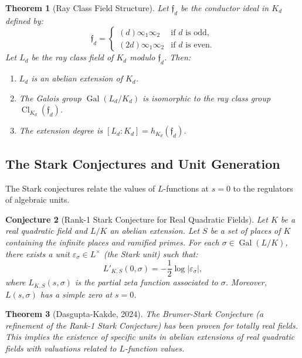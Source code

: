 \documentclass[a4paper,11pt]{article}
\newtheorem{theorem}{Theorem}[section]
\newtheorem{conjecture}[theorem]{Conjecture}
\DeclareMathOperator{\Gal}{Gal}
\DeclareMathOperator{\Cl}{Cl}
\begin{document}
\begin{theorem}[Ray Class Field Structure]\label{thm:ray-class}
Let $\mathfrak{f}_d$ be the conductor ideal in $K_d$ defined by:
\begin{equation}
\mathfrak{f}_d = \begin{cases}
(d)\infty_1\infty_2 & \text{if } d \text{ is odd}, \\
(2d)\infty_1\infty_2 & \text{if } d \text{ is even}.
\end{cases}
\end{equation}
Let $L_d$ be the ray class field of $K_d$ modulo $\mathfrak{f}_d$. Then:
\begin{enumerate}[label=(\roman*)]
    \item $L_d$ is an abelian extension of $K_d$.
    \item The Galois group $\Gal(L_d/K_d)$ is isomorphic to the ray class group $\Cl_{K_d}(\mathfrak{f}_d)$.
    \item The extension degree is $[L_d : K_d] = h_{K_d}(\mathfrak{f}_d)$.
\end{enumerate}
\end{theorem}

\subsection{The Stark Conjectures and Unit Generation}

The Stark conjectures relate the values of $L$-functions at $s=0$ to the regulators of algebraic units.

\begin{conjecture}[Rank-1 Stark Conjecture for Real Quadratic Fields]
Let $K$ be a real quadratic field and $L/K$ an abelian extension. Let $S$ be a set of places of $K$ containing the infinite places and ramified primes. For each $\sigma \in \Gal(L/K)$, there exists a unit $\varepsilon_\sigma \in L^\times$ (the Stark unit) such that:
\begin{equation}
L'_{K,S}(0, \sigma) = -\frac{1}{2} \log |\varepsilon_\sigma|,
\end{equation}
where $L_{K,S}(s, \sigma)$ is the partial zeta function associated to $\sigma$. Moreover, $L(s, \sigma)$ has a simple zero at $s=0$.
\end{conjecture}

\begin{theorem}[Dasgupta-Kakde, 2024]\label{thm:dkv}
The Brumer-Stark Conjecture (a refinement of the Rank-1 Stark Conjecture) has been proven for totally real fields. This implies the existence of specific units in abelian extensions of real quadratic fields with valuations related to $L$-function values.
\end{theorem}
\end{document}
